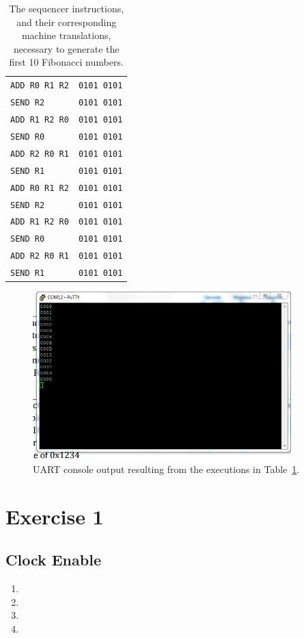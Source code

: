 \documentclass[]{article}
\begin{document}
\begin{table}[H]
\begin{tabular}{ l | l }
\texttt{ADD R0 R1 R2} & \texttt{0101 0101}\\
\texttt{SEND R2} & \texttt{0101 0101}\\
\texttt{ADD R1 R2 R0} & \texttt{0101 0101}\\
\texttt{SEND R0} & \texttt{0101 0101}\\
\texttt{ADD R2 R0 R1} & \texttt{0101 0101}\\
\texttt{SEND R1} & \texttt{0101 0101}\\
\texttt{ADD R0 R1 R2} & \texttt{0101 0101}\\
\texttt{SEND R2} & \texttt{0101 0101}\\
\texttt{ADD R1 R2 R0} & \texttt{0101 0101}\\
\texttt{SEND R0} & \texttt{0101 0101}\\
\texttt{ADD R2 R0 R1} & \texttt{0101 0101}\\
\texttt{SEND R1} & \texttt{0101 0101}\\
\end{tabular}
\caption{The sequencer instructions, and their corresponding machine translations, necessary to generate the first 10 Fibonacci numbers.}
\label{table:fib}
\end{table}

\begin{figure}[H]
\centering
\includegraphics[width=10cm]{fib.png}
\caption{UART console output resulting from the executions in Table~\ref{table:fib}.}
\end{figure}

\section{Exercise 1}


\subsection{Clock Enable}
\begin{enumerate}
\item 
\item 
\item 
\item 
\end{enumerate}
\end{document}
